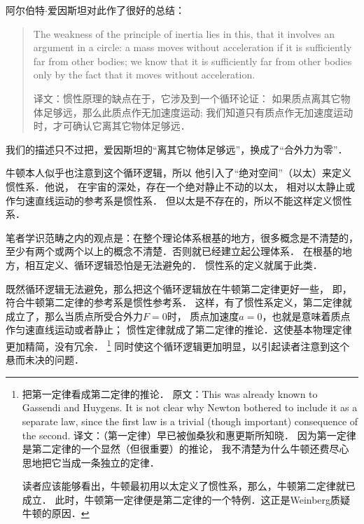 阿尔伯特$\cdot$爱因斯坦\cite[p.58]{einstein1950}对此作了很好的总结：
\begin{quotation}
    {\textsf{
    The weakness of the principle of inertia lies in this,
    that it involves an argument in a circle: a mass moves
    without acceleration if it is sufficiently far from other bodies;
    we know that it is sufficiently far from other bodies
    only by the fact that it moves without acceleration. }}

    {\fangsong 译文：惯性原理的缺点在于，它涉及到一个循环论证：
        如果质点离其它物体足够远，那么此质点作无加速度运动;
        我们知道只有质点作无加速度运动时，才可确认它离其它物体足够远．}
\end{quotation}
我们的描述只不过把，爱因斯坦的“离其它物体足够远”，换成了“合外力为零”．

牛顿本人似乎也注意到这个循环逻辑，所以
他引入了“绝对空间”（以太）来定义惯性系．他说，
在宇宙的深处，存在一个绝对静止不动的以太，
相对以太静止或作匀速直线运动的参考系是惯性系．
但以太是不存在的，所以不能这样定义惯性系．



笔者学识范畴之内的观点是：在整个理论体系根基的地方，很多概念是不清楚的，
至少有两个或两个以上的概念不清楚．否则就已经建立起公理体系．
在根基的地方，相互定义、{\kaishu 循环}逻辑恐怕是无法避免的．
惯性系的定义就属于此类．

既然循环逻辑无法避免，那么把这个循环逻辑放在牛顿第二定律更好一些，
即，符合牛顿第二定律的参考系是惯性参考系．
这样，有了惯性系定义，第二定律就成立了，那么当质点所受合外力$F=0$时，
质点加速度$a=0$，也就是意味着质点作匀速直线运动或者静止；
惯性定律就成了第二定律的推论．这使基本物理定律更加精简，没有冗余．
{\footnote{\textcite[p.114]{weinberg_ew-2015}把第一定律看成第二定律的推论．
        原文：This was already known to Gassendi and Huygens.
        It is not clear why Newton bothered to include it as a separate law,
        since the first law is a trivial (though important) consequence of the second.
        译文：（第一定律）早已被伽桑狄和惠更斯所知晓．
        因为第一定律是第二定律的一个显然（但很重要）的推论，
        我不清楚为什么牛顿还费尽心思地把它当成一条独立的定律．

    读者应该能够看出，牛顿最初用以太定义了惯性系，那么，牛顿第二定律就已成立．
    此时，牛顿第一定律便是第二定律的一个特例．这正是Weinberg质疑牛顿的原因．
}}
同时使这个{\kaishu 循环逻辑}更加明显，以引起读者注意到这个悬而未决的问题．

